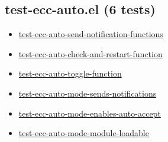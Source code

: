 \documentclass[11pt]{article}
\begin{document}
\subsection{test-ecc-auto.el (6 tests)}
\label{sec:org74dc7e7}
\begin{itemize}
\item \href{test-ecc-auto.el}{test-ecc-auto-send-notification-functions}
\item \href{test-ecc-auto.el}{test-ecc-auto-check-and-restart-function}
\item \href{test-ecc-auto.el}{test-ecc-auto-toggle-function}
\item \href{test-ecc-auto.el}{test-ecc-auto-mode-sends-notifications}
\item \href{test-ecc-auto.el}{test-ecc-auto-mode-enables-auto-accept}
\item \href{test-ecc-auto.el}{test-ecc-auto-mode-module-loadable}
\end{itemize}
\end{document}

